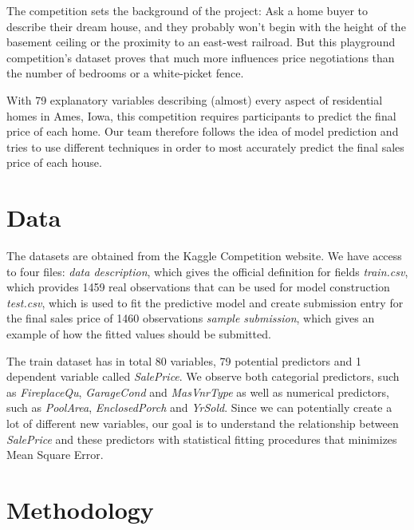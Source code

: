 \documentclass[a4paper]{article}
\begin{document}
\begin{flushleft}
The competition sets the background of the project: Ask a home buyer to describe their dream house, and they probably won't begin with the height of the basement ceiling or the proximity to an east-west railroad. But this playground competition's dataset proves that much more influences price negotiations than the number of bedrooms or a white-picket fence. \newline

With 79 explanatory variables describing (almost) every aspect of residential homes in Ames, Iowa, this competition requires participants to predict the final price of each home. Our team therefore follows the idea of model prediction and tries to use different techniques in order to most accurately predict the final sales price of each house. \newline


\section{Data}

The datasets are obtained from the Kaggle Competition website. We have access to four files: \newline
\setlength{\parindent}{3ex}\textit{data description}, which gives the official definition for fields \newline
\textit{train.csv}, which provides 1459 real observations that can be used for model construction \newline
\textit{test.csv}, which is used to fit the predictive model and create submission entry for the final sales price of 1460 observations \newline
\textit{sample submission}, which gives an example of how the fitted values should be submitted. \newline

The train dataset has in total 80 variables, 79 potential predictors and 1 dependent variable called \textit{SalePrice}. We observe both categorial predictors, such as \textit{FireplaceQu}, \textit{GarageCond} and \textit{MasVnrType} as well as numerical predictors, such as \textit{PoolArea}, \textit{EnclosedPorch} and \textit{YrSold}. Since we can potentially create a lot of different new variables, our goal is to understand the relationship between \textit{SalePrice} and these predictors with statistical fitting procedures that minimizes Mean Square Error.



\section{Methodology}




\end{flushleft}
\end{document}
